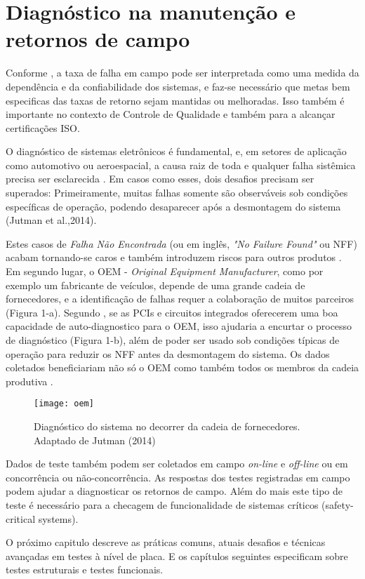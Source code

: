 \section{Diagnóstico na manutenção e retornos de campo}

Conforme \citet{jutman2014high}, a taxa de falha em campo pode ser interpretada como uma medida da dependência e da confiabilidade dos sistemas, e faz-se necessário que metas bem especificas das taxas de retorno sejam mantidas ou melhoradas. Isso também é importante no contexto de Controle de Qualidade e também para a alcançar certificações ISO.

O diagnóstico de sistemas eletrônicos é fundamental, e, em setores de aplicação como automotivo ou aeroespacial, a causa raiz de toda e qualquer falha sistêmica precisa ser esclarecida \citep{abelein2014non}. Em casos como esses, dois desafios precisam ser superados: Primeiramente, muitas falhas somente são observáveis sob condições específicas de operação, podendo desaparecer após a desmontagem do sistema (Jutman et al.,2014). 

Estes casos de \textit{Falha Não Encontrada} (ou em inglês, \textit{"No Failure Found"} ou NFF) acabam tornando-se caros e também introduzem riscos para outros produtos \citep{conroy2005practical}. Em segundo lugar, o OEM - \textit{Original Equipment Manufacturer}, como por exemplo um fabricante de veículos, depende de uma grande cadeia de fornecedores, e a identificação de falhas requer a colaboração de muitos parceiros (Figura 1-a). Segundo \citet{jutman2014high}, se as PCIs e circuitos integrados oferecerem uma boa capacidade de auto-diagnostico para o OEM, isso ajudaria a encurtar o processo de diagnóstico (Figura 1-b), além de poder ser usado sob condições típicas de operação para reduzir os NFF antes da desmontagem do sistema. Os dados coletados beneficiariam não só o OEM como também todos os membros da cadeia produtiva \citep{cook2014diagnosis}.
    \begin{figure}
        \centering
        \texttt{[image: oem]}
        \label{fig:supplychain}
        \caption{Diagnóstico do sistema no decorrer da cadeia de fornecedores. Adaptado de Jutman (2014)}
    \end{figure}
Dados de teste também podem ser coletados em campo \textit{on-line} e \textit{off-line} ou em concorrência ou não-concorrência. As respostas dos testes registradas em campo podem ajudar a diagnosticar os retornos de campo. Além do mais este tipo de teste é necessário para a checagem de funcionalidade de sistemas críticos (safety-critical systems).

O próximo capitulo descreve as práticas comuns, atuais desafios e técnicas avançadas em testes à nível de placa. E os capítulos seguintes especificam sobre testes estruturais e testes funcionais.
